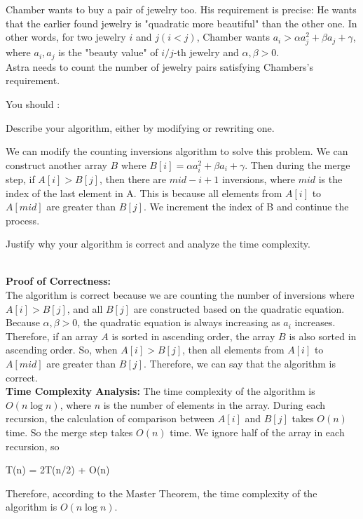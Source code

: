 \begin{parts}
Chamber wants to buy a pair of jewelry too. His requirement is precise: He wants that the earlier found jewelry is "quadratic more beautiful" than the other one. In other words, for two jewelry $i$ and $j(i<j)$, Chamber wants $a_i>\alpha a_j^2+\beta a_j + \gamma$, where $a_i,a_j$ is the "beauty value" of $i/j$-th jewelry and $\alpha,\beta>0$.\\
Astra needs to count the number of jewelry pairs satisfying Chambers's requirement.

You should :
\begin{subparts}
  \subpart[4]Describe your algorithm, either by modifying or rewriting one.
    \begin{solution}
        We can modify the counting inversions algorithm to solve this problem. We can construct another array $B$ where $B[i] = \alpha a_i^2 + \beta a_i + \gamma$. Then during the merge step, if $A[i] > B[j]$, then there are $mid - i + 1$ inversions, where $mid$ is the index of the last element in A. This is because all elements from $A[i]$ to $A[mid]$ are greater than $B[j]$. We increment the index of B and continue the process.
    \end{solution}
    \subpart[2] Justify why your algorithm is correct and analyze the time complexity. 
    \begin{solution}
        \\
        \textbf{Proof of Correctness:}\\
        The algorithm is correct because we are counting the number of inversions where $A[i] > B[j]$, and all $B[j]$ are constructed based on the quadratic equation. Because $\alpha, \beta > 0$, the quadratic equation is always increasing as $a_i$ increases. Therefore, if an array $A$ is sorted in ascending order, the array $B$ is also sorted in ascending order. So, when $A[i] > B[j]$, then all elements from $A[i]$ to $A[mid]$ are greater than $B[j]$. Therefore, we can say that the algorithm is correct.
        \\
        \textbf{Time Complexity Analysis:} 
        The time complexity of the algorithm is $O(n\log n)$, where $n$ is the number of elements in the array. During each recursion, the calculation of comparison between $A[i]$ and $B[j]$ takes $O(n)$ time. So the merge step takes $O(n)$ time. We ignore half of the array in each recursion, so 
        \begin{center}
            T(n) = 2T(n/2) + O(n)
        \end{center}
        Therefore, according to the Master Theorem, the time complexity of the algorithm is $O(n\log n)$.
    \end{solution}
\end{subparts}


\end{parts}
